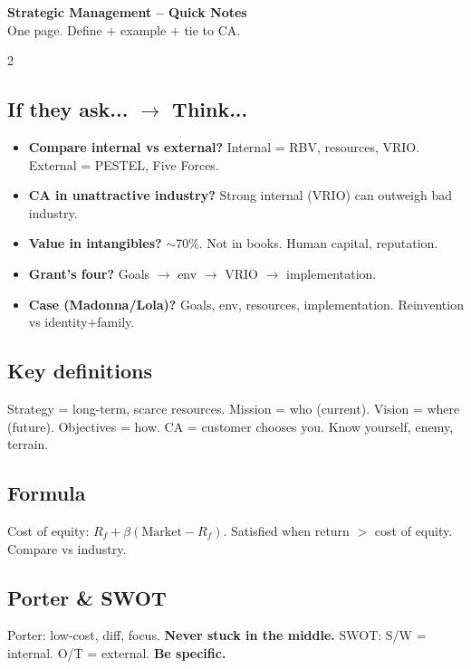 \documentclass[10pt,landscape,a4paper]{article}
\begin{document}
\normalsize

\begin{center}
{\LARGE\bfseries\color{accent} Strategic Management -- Quick Notes}\\[0.3em]
\small One page. Define + example + tie to CA.
\end{center}
\vspace{0.5em}

\begin{multicols}{2}

\subsection*{\color{accent} If they ask... $\to$ Think...}
\begin{itemize}[leftmargin=*,nosep]
\item \textbf{Compare internal vs external?} Internal = RBV, resources, VRIO. External = PESTEL, Five Forces.
\item \textbf{CA in unattractive industry?} Strong internal (VRIO) can outweigh bad industry.
\item \textbf{Value in intangibles?} $\sim$70\%. Not in books. Human capital, reputation.
\item \textbf{Grant's four?} Goals $\to$ env $\to$ VRIO $\to$ implementation.
\item \textbf{Case (Madonna/Lola)?} Goals, env, resources, implementation. Reinvention vs identity+family.
\end{itemize}

\subsection*{\color{accent} Key definitions}
Strategy = long-term, scarce resources. Mission = who (current). Vision = where (future). Objectives = how. CA = customer chooses you. Know yourself, enemy, terrain.

\subsection*{\color{accent} Formula}
Cost of equity: $R_f + \beta(\text{Market} - R_f)$. Satisfied when return $>$ cost of equity. Compare vs industry.

\subsection*{\color{accent} Porter \& SWOT}
Porter: low-cost, diff, focus. \textbf{Never stuck in the middle.} SWOT: S/W = internal. O/T = external. \textbf{Be specific.}


\end{multicols}
\end{document}
